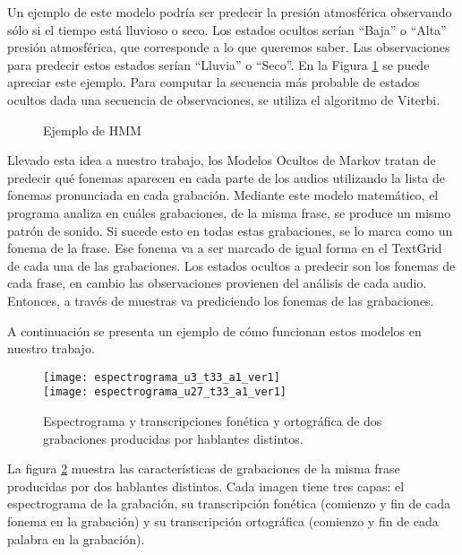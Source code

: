 Un ejemplo de este modelo podría ser predecir la presión atmosférica observando sólo si el tiempo está lluvioso o seco. Los estados ocultos serían ``Baja'' o ``Alta'' presión atmosférica, que corresponde a lo que queremos saber. Las observaciones para predecir estos estados serían ``Lluvia'' o ``Seco''. En la Figura \ref{ex_hmm} se puede apreciar este ejemplo. Para computar la secuencia más probable de estados ocultos dada una secuencia de observaciones, se utiliza el algoritmo de Viterbi.

\begin{figure}[htbp]
	\begin{center}
	\end{center}
	\caption{Ejemplo de HMM}
	\label{ex_hmm}
\end{figure}

Llevado esta idea a nuestro trabajo, los Modelos Ocultos de Markov tratan de predecir qué fonemas aparecen en cada parte de los audios utilizando la lista de fonemas pronunciada en cada grabación. Mediante este modelo matemático, el programa analiza en cuáles grabaciones, de la misma frase, se produce un mismo patrón de sonido. Si sucede esto en todas estas grabaciones, se lo marca como un fonema de la frase. Ese fonema va a ser marcado de igual forma en el TextGrid de cada una de las grabaciones. Los estados ocultos a predecir son los fonemas de cada frase, en cambio las observaciones provienen del análisis de cada audio. Entonces, a través de muestras va prediciendo los fonemas de las grabaciones.

A continuación se presenta un ejemplo de cómo funcionan estos modelos en nuestro trabajo. 
%
\begin{figure}[H]
	\centering
	\texttt{[image: espectrograma\_u3\_t33\_a1\_ver1]} \\
	\smallskip
	\texttt{[image: espectrograma\_u27\_t33\_a1\_ver1]} 
	\caption{Espectrograma y transcripciones fonética y ortográfica de dos grabaciones producidas por hablantes distintos.}
	\label{car_a1}
\end{figure}
%
La figura \ref{car_a1} muestra las características de grabaciones de la misma frase producidas por dos hablantes distintos. Cada imagen tiene tres capas: el espectrograma de la grabación, su transcripción fonética (comienzo y fin de cada fonema en la grabación) y su transcripción ortográfica (comienzo y fin de cada palabra en la grabación).

